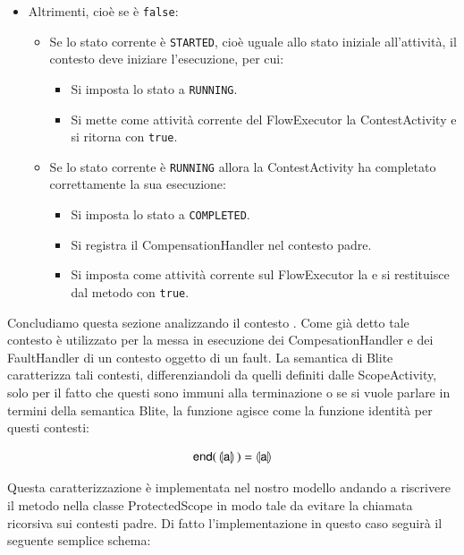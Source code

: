 \begin{itemize}
  \item Altrimenti, cioè se  è \texttt{false}:
  	\begin{itemize}
  		\item Se lo stato corrente \`e \texttt{STARTED}, cioè uguale allo stato
  		iniziale all'attività, il contesto deve iniziare l'esecuzione, per cui:
  			\begin{itemize} 
                \item Si imposta lo stato a \texttt{RUNNING}.
                \item Si mette come attività corrente del FlowExecutor la
                ContestActivity e si ritorna con \texttt{true}.
        	\end{itemize}   
  		\item Se lo stato corrente \`e \texttt{RUNNING} allora la ContestActivity
  		ha completato correttamente la sua esecuzione:
  			\begin{itemize} 
                \item Si imposta lo stato a \texttt{COMPLETED}. 
                \item Si registra il CompensationHandler nel contesto padre.
                \item Si imposta come attività corrente sul FlowExecutor la
                 e si restituisce dal metodo con
                \texttt{true}.
        	\end{itemize}  		 
	\end{itemize}
\end{itemize} 


Concludiamo questa sezione analizzando il contesto . Come
già detto tale contesto è utilizzato per la messa in esecuzione dei
CompesationHandler e dei FaultHandler di un contesto oggetto di un fault.
La semantica di Blite caratterizza tali contesti, differenziandoli da quelli
definiti dalle ScopeActivity, solo per il fatto che questi sono immuni alla
terminazione o se si vuole parlare in termini della semantica Blite, la
funzione {} agisce come la funzione identità per questi
contesti:

$$
\sf{ end( \, \llparenthesis a \rrparenthesis \, ) = \llparenthesis a
\rrparenthesis }
$$
 
Questa caratterizzazione è implementata nel nostro modello andando a
riscrivere il metodo  nella classe ProtectedScope in
modo tale da evitare la chiamata ricorsiva sui contesti padre. Di fatto
l'implementazione in questo caso seguirà il seguente semplice schema:

